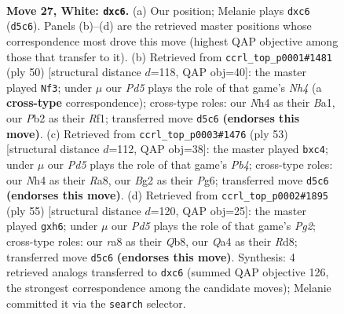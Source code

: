 \documentclass[11pt]{article}
\begin{document}
\clearpage

\begin{figure}[p]\centering
\begin{subfigure}{0.46\textwidth}\centering
\resizebox{\linewidth}{!}{%
\newchessgame
\chessboard[
  setfen={r1bn1k2/1p1p1pp1/p2q4/2pPr1np/QB5N/4P1P1/PP2RPBP/1R4K1 w - c6 0 27},
  showmover=false,
  pgfstyle=straightmove, color=movearrow, markmove={d5-c6}
]}
\caption{}
\end{subfigure}\hfill
\begin{subfigure}{0.46\textwidth}\centering
\resizebox{\linewidth}{!}{%
\newchessgame
\chessboard[
  setfen={r5k1/p1b1qp1p/2p3p1/1p1rp3/1n3P1N/1P2P1P1/PQ1P3P/B2R1RK1 w - - 4 26},
  showmover=false,
  pgfstyle=straightmove, color=movearrow, markmove={h4-f3}
]}
\caption{}
\end{subfigure}
\\[4pt]
\begin{subfigure}{0.46\textwidth}\centering
\resizebox{\linewidth}{!}{%
\newchessgame
\chessboard[
  setfen={r3r1k1/p4p2/6p1/PppP1b1p/2P1p2q/1NQ1P2P/R4n1K/1R3BN1 b - - 1 27},
  showmover=false,
  pgfstyle=straightmove, color=movearrow, markmove={b5-c4}
]}
\caption{}
\end{subfigure}\hfill
\begin{subfigure}{0.46\textwidth}\centering
\resizebox{\linewidth}{!}{%
\newchessgame
\chessboard[
  setfen={rqbr1bk1/5ppp/p5nN/1ppP2P1/4N3/P3B3/1PQ2P1P/1K1R2R1 b - - 6 28},
  showmover=false,
  pgfstyle=straightmove, color=movearrow, markmove={g7-h6}
]}
\caption{}
\end{subfigure}
\caption{\textbf{Move 27, White: \texttt{dxc6}.} (a) Our position; Melanie plays \texttt{dxc6} (\texttt{d5c6}). Panels (b)--(d) are the retrieved master positions whose correspondence most drove this move (highest QAP objective among those that transfer to it). (b) Retrieved from \texttt{ccrl\_top\_p0001\#1481} (ply 50) [structural distance $d$=118, QAP obj=40]: the master played \texttt{Nf3}; under $\mu$ our \emph{Pd5} plays the role of that game's \emph{Nh4} (a \textbf{cross-type} correspondence); cross-type roles: our \emph{N}h4 as their \emph{B}a1, our \emph{P}b2 as their \emph{R}f1; transferred move \texttt{d5c6} \textbf{(endorses this move)}. (c) Retrieved from \texttt{ccrl\_top\_p0003\#1476} (ply 53) [structural distance $d$=112, QAP obj=38]: the master played \texttt{bxc4}; under $\mu$ our \emph{Pd5} plays the role of that game's \emph{Pb4}; cross-type roles: our \emph{N}h4 as their \emph{R}a8, our \emph{B}g2 as their \emph{P}g6; transferred move \texttt{d5c6} \textbf{(endorses this move)}. (d) Retrieved from \texttt{ccrl\_top\_p0002\#1895} (ply 55) [structural distance $d$=120, QAP obj=25]: the master played \texttt{gxh6}; under $\mu$ our \emph{Pd5} plays the role of that game's \emph{Pg2}; cross-type roles: our \emph{r}a8 as their \emph{Q}b8, our \emph{Q}a4 as their \emph{R}d8; transferred move \texttt{d5c6} \textbf{(endorses this move)}. Synthesis: 4 retrieved analogs transferred to \texttt{dxc6} (summed QAP objective 126, the strongest correspondence among the candidate moves); Melanie committed it via the \texttt{search} selector.}
\label{fig:thought-m52}
\end{figure}
\end{document}

